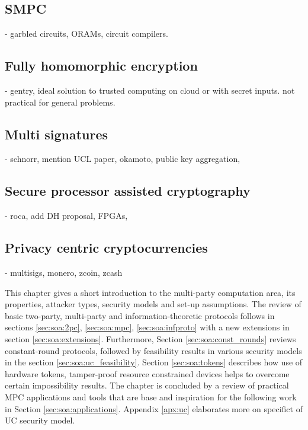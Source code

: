\documentclass[
  digital, %
  twoside, %
  table,   %
  lof,     %
  lot,     %
]{fithesis3}
\theoremstyle{definition}
\theoremstyle{remark}
\begin{document}
\begin{ecmmnt}
    \subsection{SMPC}
    - garbled circuits, ORAMs, circuit compilers.
    
    \subsection{Fully homomorphic encryption}
    - gentry, ideal solution to trusted computing on cloud or with secret inputs. not practical for general problems.
    
    \subsection{Multi signatures}
    - schnorr, mention UCL paper, okamoto, public key aggregation,  
    
    \subsection{Secure processor assisted cryptography}
    - roca, add DH proposal, FPGAs, 
    
    \subsection{Privacy centric cryptocurrencies}
    - multisigs, monero, zcoin, zcash
\end{ecmmnt}
%

This chapter gives a short introduction to the multi-party computation area, its properties, attacker types, security models and set-up assumptions. The review of basic two-party, multi-party and information-theoretic protocols follows in sections \ref{sec:soa:2pc}, \ref{sec:soa:mpc}, \ref{sec:soa:infproto} with a new extensions in section \ref{sec:soa:extensions}. Furthermore, Section \ref{sec:soa:const_rounds} reviews constant-round protocols, followed by feasibility results in various security models in the section \ref{sec:soa:uc_feasibility}. Section \ref{sec:soa:tokens} describes how use of hardware tokens, tamper-proof resource constrained devices helps to overcome certain impossibility results. The chapter is concluded by a review of practical MPC applications and tools that are base and inspiration for the following work in Section \ref{sec:soa:applications}. Appendix \ref{apx:uc} elaborates more on specifict of UC security model.
\end{document}
